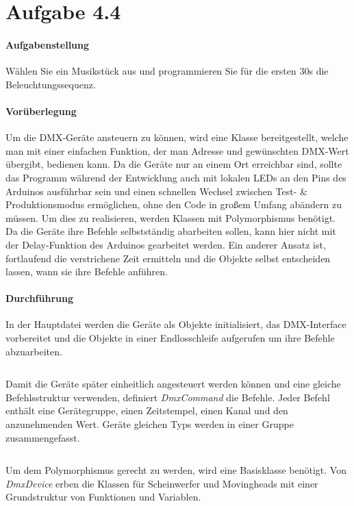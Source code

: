 \section{Aufgabe 4.4}
\paragraph{Aufgabenstellung}
Wählen Sie ein Musikstück aus und programmieren Sie für die ersten 30s die Beleuchtungssequenz.

\paragraph{Vorüberlegung}
Um die DMX-Geräte ansteuern zu können, wird eine Klasse bereitgestellt, welche man mit einer einfachen Funktion, der man Adresse und gewünschten DMX-Wert übergibt, bedienen kann. Da die Geräte nur an einem Ort erreichbar sind, sollte das Programm während der Entwicklung auch mit lokalen LEDs an den Pins des Arduinos ausführbar sein und einen schnellen Wechsel zwischen Test- \& Produktionsmodus ermöglichen, ohne den Code in großem Umfang abändern zu müssen. Um dies zu realisieren, werden Klassen mit Polymorphismus benötigt. Da die Geräte ihre Befehle selbstständig abarbeiten sollen, kann hier nicht mit der Delay-Funktion des Arduinos gearbeitet werden. Ein anderer Ansatz ist, fortlaufend die verstrichene Zeit ermitteln und die Objekte selbst entscheiden lassen, wann sie ihre Befehle anführen.

\paragraph{Durchführung}
In der Hauptdatei werden die Geräte als Objekte initialisiert, das DMX-Interface vorbereitet und die Objekte in einer Endlosschleife aufgerufen um ihre Befehle abzuarbeiten.
\inputminted[linenos=true, breaklines, fontsize=\fontsize{10pt}{10pt}]{cpp}{../src/main.cpp}

Damit die Geräte später einheitlich angesteuert werden können und eine gleiche Befehlsstruktur verwenden, definiert \textit{DmxCommand} die Befehle. Jeder Befehl enthält eine Gerätegruppe, einen Zeitstempel, einen Kanal und den anzunehmenden Wert. Geräte gleichen Typs werden in einer Gruppe zusammengefasst.
\inputminted[linenos=true, breaklines, fontsize=\fontsize{10pt}{10pt}]{cpp}{../src/DmxCommand.h}

Um dem Polymorphismus gerecht zu werden, wird eine Basisklasse benötigt. Von \textit{DmxDevice} erben die Klassen für Scheinwerfer und Movingheads mit einer Grundstruktur von Funktionen und Variablen.
\inputminted[linenos=true, breaklines, fontsize=\fontsize{10pt}{10pt}]{cpp}{../src/DmxDevice.h}

